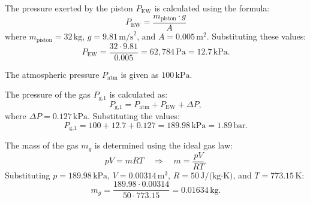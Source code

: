 The pressure exerted by the piston \( P_{\text{EW}} \) is calculated using the formula:  
\[
P_{\text{EW}} = \frac{m_{\text{piston}} \cdot g}{A}
\]  
where \( m_{\text{piston}} = 32 \, \text{kg} \), \( g = 9.81 \, \text{m/s}^2 \), and \( A = 0.005 \, \text{m}^2 \). Substituting these values:  
\[
P_{\text{EW}} = \frac{32 \cdot 9.81}{0.005} = 62,784 \, \text{Pa} = 12.7 \, \text{kPa}.
\]  

The atmospheric pressure \( P_{\text{atm}} \) is given as \( 100 \, \text{kPa} \).  

The pressure of the gas \( P_{\text{g,1}} \) is calculated as:  
\[
P_{\text{g,1}} = P_{\text{atm}} + P_{\text{EW}} + \Delta P,
\]  
where \( \Delta P = 0.127 \, \text{kPa} \). Substituting the values:  
\[
P_{\text{g,1}} = 100 + 12.7 + 0.127 = 189.98 \, \text{kPa} = 1.89 \, \text{bar}.
\]  

The mass of the gas \( m_g \) is determined using the ideal gas law:  
\[
pV = mRT \quad \Rightarrow \quad m = \frac{pV}{RT}.
\]  
Substituting \( p = 189.98 \, \text{kPa} \), \( V = 0.00314 \, \text{m}^3 \), \( R = 50 \, \text{J/(kg·K)} \), and \( T = 773.15 \, \text{K} \):  
\[
m_g = \frac{189.98 \cdot 0.00314}{50 \cdot 773.15} = 0.01634 \, \text{kg}.
\]